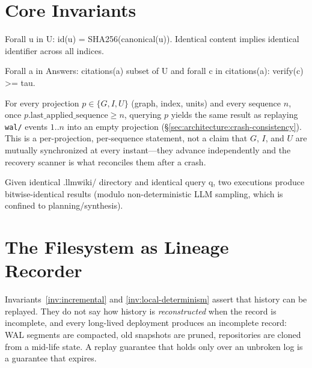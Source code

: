 \section{Core Invariants}
\label{sec:architecture:invariants}

\begin{invariant}
\label{inv:content-address}
Forall u in U: id(u) = SHA256(canonical(u)). Identical content implies identical identifier across all indices.
\end{invariant}

\begin{invariant}
\label{inv:evidence-closure}
Forall a in Answers: citations(a) subset of U and forall c in citations(a): verify(c) >= tau.
\end{invariant}

\begin{invariant}
\label{inv:incremental}
For every projection $p \in \{G, I, U\}$ (graph, index, units) and every sequence $n$, once $p.\text{last\_applied\_sequence} \geq n$, querying $p$ yields the same result as replaying \texttt{wal/} events $1..n$ into an empty projection (\S\ref{sec:architecture:crash-consistency}). This is a per-projection, per-sequence statement, not a claim that $G$, $I$, and $U$ are mutually synchronized at every instant---they advance independently and the recovery scanner is what reconciles them after a crash.
\end{invariant}

\begin{invariant}
\label{inv:local-determinism}
Given identical .llmwiki/ directory and identical query q, two executions produce bitwise-identical results (modulo non-deterministic LLM sampling, which is confined to planning/synthesis).
\end{invariant}

\section{The Filesystem as Lineage Recorder}
\label{sec:architecture:lineage}

Invariants~\ref{inv:incremental} and \ref{inv:local-determinism} assert that history can be replayed. They do not say how history is \emph{reconstructed} when the record is incomplete, and every long-lived deployment produces an incomplete record: WAL segments are compacted, old snapshots are pruned, repositories are cloned from a mid-life state. A replay guarantee that holds only over an unbroken log is a guarantee that expires.

